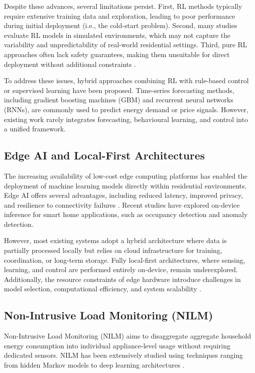\documentclass[11pt,a4paper]{article}
\begin{document}
Despite these advances, several limitations persist. First, RL methods typically require extensive training data and exploration, leading to poor performance during initial deployment (i.e., the cold-start problem). Second, many studies evaluate RL models in simulated environments, which may not capture the variability and unpredictability of real-world residential settings. Third, pure RL approaches often lack safety guarantees, making them unsuitable for direct deployment without additional constraints \cite{wang2020reinforcement}.

To address these issues, hybrid approaches combining RL with rule-based control or supervised learning have been proposed. Time-series forecasting methods, including gradient boosting machines (GBM) and recurrent neural networks (RNNs), are commonly used to predict energy demand or price signals. However, existing work rarely integrates forecasting, behavioural learning, and control into a unified framework.

\subsection{Edge AI and Local-First Architectures}

The increasing availability of low-cost edge computing platforms has enabled the deployment of machine learning models directly within residential environments. Edge AI offers several advantages, including reduced latency, improved privacy, and resilience to connectivity failures \cite{shi2016edge, zhou2019edge}. Recent studies have explored on-device inference for smart home applications, such as occupancy detection and anomaly detection.

However, most existing systems adopt a hybrid architecture where data is partially processed locally but relies on cloud infrastructure for training, coordination, or long-term storage. Fully local-first architectures, where sensing, learning, and control are performed entirely on-device, remain underexplored. Additionally, the resource constraints of edge hardware introduce challenges in model selection, computational efficiency, and system scalability \cite{zhou2019edge}.

\subsection{Non-Intrusive Load Monitoring (NILM)}

Non-Intrusive Load Monitoring (NILM) aims to disaggregate aggregate household energy consumption into individual appliance-level usage without requiring dedicated sensors. NILM has been extensively studied using techniques ranging from hidden Markov models to deep learning architectures \cite{hart1992nonintrusive, kelly2015neural}.
\end{document}
